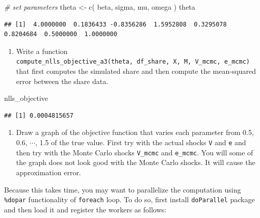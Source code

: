 \documentclass[
]{book}
\newenvironment{Shaded}{\begin{snugshade}}{\end{snugshade}}
\newcommand{\CommentTok}[1]{\textcolor[rgb]{0.56,0.35,0.01}{\textit{#1}}}
\newcommand{\FunctionTok}[1]{\textcolor[rgb]{0.00,0.00,0.00}{#1}}
\newcommand{\NormalTok}[1]{#1}
\newcommand{\OtherTok}[1]{\textcolor[rgb]{0.56,0.35,0.01}{#1}}
\providecommand{\tightlist}{%
  \setlength{\itemsep}{0pt}\setlength{\parskip}{0pt}}
\begin{document}
\begin{Shaded}
\begin{Highlighting}[]
\CommentTok{\# set parameters}
\NormalTok{theta }\OtherTok{\textless{}{-}} 
  \FunctionTok{c}\NormalTok{(}
\NormalTok{    beta, }
\NormalTok{    sigma, }
\NormalTok{    mu, }
\NormalTok{    omega}
\NormalTok{    )}
\NormalTok{theta}
\end{Highlighting}
\end{Shaded}

\begin{verbatim}
## [1]  4.0000000  0.1836433 -0.8356286  1.5952808  0.3295078  0.8204684  0.5000000  1.0000000
\end{verbatim}

\begin{enumerate}
\def\labelenumi{\arabic{enumi}.}
\setcounter{enumi}{5}
\tightlist
\item
  Write a function \texttt{compute\_nlls\_objective\_a3(theta,\ df\_share,\ X,\ M,\ V\_mcmc,\ e\_mcmc)} that first computes the simulated share and then compute the mean-squared error between the share data.
\end{enumerate}

\begin{Shaded}
\begin{Highlighting}[]
\NormalTok{nlls\_objective}
\end{Highlighting}
\end{Shaded}

\begin{verbatim}
## [1] 0.0004815657
\end{verbatim}

\begin{enumerate}
\def\labelenumi{\arabic{enumi}.}
\setcounter{enumi}{6}
\tightlist
\item
  Draw a graph of the objective function that varies each parameter from 0.5, 0.6, \(\cdots\), 1.5 of the true value. First try with the actual shocks \texttt{V} and \texttt{e} and then try with the Monte Carlo shocks \texttt{V\_mcmc} and \texttt{e\_mcmc}. You will some of the graph does not look good with the Monte Carlo shocks. It will cause the approximation error.
\end{enumerate}

Because this takes time, you may want to parallelize the computation using \texttt{\%dopar} functionality of \texttt{foreach} loop. To do so, first install \texttt{doParallel} package and then load it and register the workers as follows:
\end{document}
